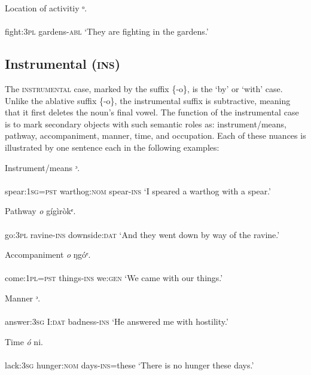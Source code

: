 Location of activitiy
\ea\label{ex:}
ᵒ. \\
    \\
fight:\textsc{3pl}   gardens-\textsc{abl}
\glt ‘They are fighting in the gardens.’ 
\z






\subsection{Instrumental (\textsc{ins})}


The \textsc{instrumental} case, marked by the suffix \{-o\}, is the ‘by’ or ‘with’ case. Unlike the ablative suffix \{-o\}, the instrumental suffix is subtractive, meaning that it first deletes the noun’s final vowel. The function of the instrumental case is to mark secondary objects with such semantic roles as: instrument/means, pathway, accompaniment, manner, time, and occupation. Each of these nuances is illustrated by one sentence each in the following examples:




Instrument/means
\ea\label{ex:}
ᵓ. \\
    \\
spear:\textsc{1sg}=\textsc{pst}   warthog:\textsc{nom}   spear-\textsc{ins}
\glt ‘I speared a warthog with a spear.’ 
\z




Pathway
\ea\label{ex:}
\textit{o}     gígìròkᵉ. \\
    \\
go:\textsc{3pl}   ravine-\textsc{ins}   downside:\textsc{dat}
\glt ‘And they went down by way of the ravine.’ 
\z



Accompaniment
\ea\label{ex:}
\textit{o}   ŋgóᵉ. \\
    \\
come:\textsc{1pl}=\textsc{pst}   things-\textsc{ins}   we:\textsc{gen}
\glt ‘We came with our things.’ 
\z




Manner
\ea\label{ex:}
ᵓ. \\
    \\
answer:\textsc{3sg}   I:\textsc{dat}   badness-\textsc{ins}
\glt ‘He answered me with hostility.’ 
\z




Time
\ea\label{ex:}
\textit{ó} ni. \\
    \\
lack:\textsc{3sg}   hunger:\textsc{nom}   days-\textsc{ins}=these
\glt ‘There is no hunger these days.’ 
\z




